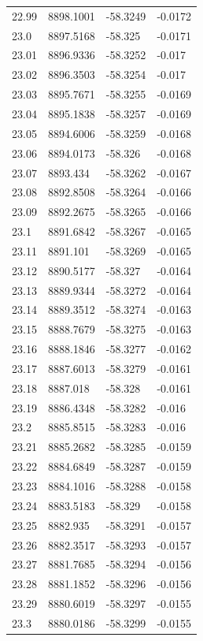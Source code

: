 \begin{table}[H]
\begin{tabular}{llll}
22.99 & 8898.1001 & -58.3249 & -0.0172 \\
23.0 & 8897.5168 & -58.325 & -0.0171 \\
23.01 & 8896.9336 & -58.3252 & -0.017 \\
23.02 & 8896.3503 & -58.3254 & -0.017 \\
23.03 & 8895.7671 & -58.3255 & -0.0169 \\
23.04 & 8895.1838 & -58.3257 & -0.0169 \\
23.05 & 8894.6006 & -58.3259 & -0.0168 \\
23.06 & 8894.0173 & -58.326 & -0.0168 \\
23.07 & 8893.434 & -58.3262 & -0.0167 \\
23.08 & 8892.8508 & -58.3264 & -0.0166 \\
23.09 & 8892.2675 & -58.3265 & -0.0166 \\
23.1 & 8891.6842 & -58.3267 & -0.0165 \\
23.11 & 8891.101 & -58.3269 & -0.0165 \\
23.12 & 8890.5177 & -58.327 & -0.0164 \\
23.13 & 8889.9344 & -58.3272 & -0.0164 \\
23.14 & 8889.3512 & -58.3274 & -0.0163 \\
23.15 & 8888.7679 & -58.3275 & -0.0163 \\
23.16 & 8888.1846 & -58.3277 & -0.0162 \\
23.17 & 8887.6013 & -58.3279 & -0.0161 \\
23.18 & 8887.018 & -58.328 & -0.0161 \\
23.19 & 8886.4348 & -58.3282 & -0.016 \\
23.2 & 8885.8515 & -58.3283 & -0.016 \\
23.21 & 8885.2682 & -58.3285 & -0.0159 \\
23.22 & 8884.6849 & -58.3287 & -0.0159 \\
23.23 & 8884.1016 & -58.3288 & -0.0158 \\
23.24 & 8883.5183 & -58.329 & -0.0158 \\
23.25 & 8882.935 & -58.3291 & -0.0157 \\
23.26 & 8882.3517 & -58.3293 & -0.0157 \\
23.27 & 8881.7685 & -58.3294 & -0.0156 \\
23.28 & 8881.1852 & -58.3296 & -0.0156 \\
23.29 & 8880.6019 & -58.3297 & -0.0155 \\
23.3 & 8880.0186 & -58.3299 & -0.0155 \\

\end{tabular}
\end{table}
